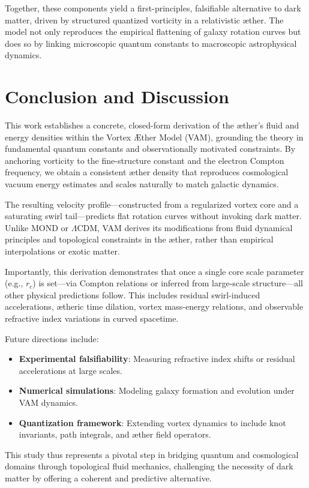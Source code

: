 \documentclass[12pt]{article}
\begin{document}
Together, these components yield a first-principles, falsifiable alternative to dark matter, driven by structured quantized vorticity in a relativistic æther. The model not only reproduces the empirical flattening of galaxy rotation curves but does so by linking microscopic quantum constants to macroscopic astrophysical dynamics.

\section{Conclusion and Discussion}

This work establishes a concrete, closed-form derivation of the æther’s fluid and energy densities within the Vortex \AE{}ther Model (VAM), grounding the theory in fundamental quantum constants and observationally motivated constraints. By anchoring vorticity to the fine-structure constant and the electron Compton frequency, we obtain a consistent æther density that reproduces cosmological vacuum energy estimates and scales naturally to match galactic dynamics.

The resulting velocity profile—constructed from a regularized vortex core and a saturating swirl tail—predicts flat rotation curves without invoking dark matter. Unlike MOND or $\Lambda$CDM, VAM derives its modifications from fluid dynamical principles and topological constraints in the æther, rather than empirical interpolations or exotic matter.

Importantly, this derivation demonstrates that once a single core scale parameter (e.g., \( r_c \)) is set—via Compton relations or inferred from large-scale structure—all other physical predictions follow. This includes residual swirl-induced accelerations, ætheric time dilation, vortex mass-energy relations, and observable refractive index variations in curved spacetime.

Future directions include:
\begin{itemize}
    \item \textbf{Experimental falsifiability}: Measuring refractive index shifts or residual accelerations at large scales.
    \item \textbf{Numerical simulations}: Modeling galaxy formation and evolution under VAM dynamics.
    \item \textbf{Quantization framework}: Extending vortex dynamics to include knot invariants, path integrals, and æther field operators.
\end{itemize}

This study thus represents a pivotal step in bridging quantum and cosmological domains through topological fluid mechanics, challenging the necessity of dark matter by offering a coherent and predictive alternative.





\end{document}
